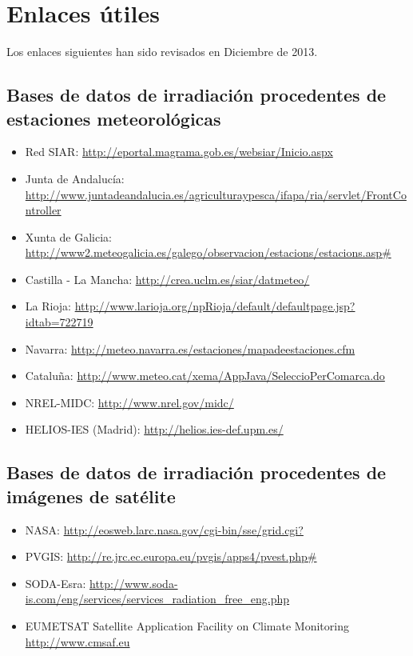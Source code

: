 \chapter{Enlaces útiles}
\label{chap:enlaces}

Los enlaces siguientes han sido revisados en Diciembre de 2013.

\section{Bases de datos de irradiación procedentes de estaciones
  meteorológicas}


\begin{itemize}
\item Red SIAR:
  \url{http://eportal.magrama.gob.es/websiar/Inicio.aspx}
\item Junta de Andalucía:
  \url{http://www.juntadeandalucia.es/agriculturaypesca/ifapa/ria/servlet/FrontController}
\item Xunta de Galicia:
  \url{http://www2.meteogalicia.es/galego/observacion/estacions/estacions.asp#}
\item Castilla - La Mancha:
  \url{http://crea.uclm.es/siar/datmeteo/}
\item La Rioja:
  \url{http://www.larioja.org/npRioja/default/defaultpage.jsp?idtab=722719}
\item Navarra:
  \url{http://meteo.navarra.es/estaciones/mapadeestaciones.cfm}
\item Cataluña: \url{http://www.meteo.cat/xema/AppJava/SeleccioPerComarca.do}
\item NREL-MIDC: \url{http://www.nrel.gov/midc/}
\item HELIOS-IES (Madrid): \url{http://helios.ies-def.upm.es/}
\end{itemize}

\section{Bases de datos de irradiación procedentes de imágenes de
  satélite}
\begin{itemize}
\item NASA: \url{http://eosweb.larc.nasa.gov/cgi-bin/sse/grid.cgi?}
\item PVGIS: \url{http://re.jrc.ec.europa.eu/pvgis/apps4/pvest.php#}
\item SODA-Esra:
  \url{http://www.soda-is.com/eng/services/services_radiation_free_eng.php}
\item EUMETSAT Satellite Application Facility on Climate Monitoring
  \url{http://www.cmsaf.eu}
\end{itemize}



